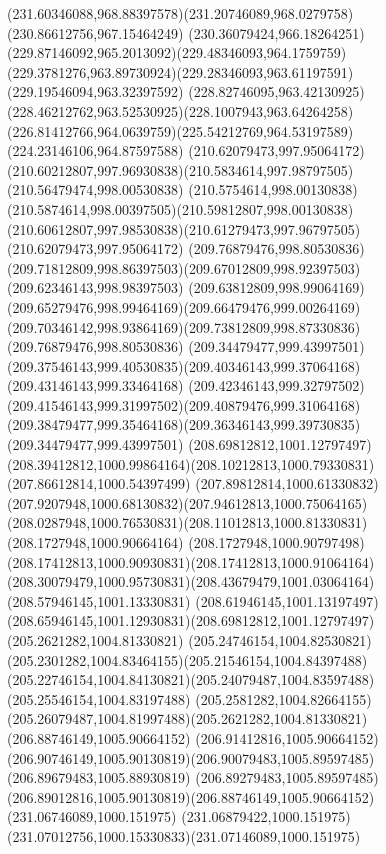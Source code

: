 {{\curveto(231.60346088,968.88397578)(231.20746089,968.0279758)(230.86612756,967.15464249)
\curveto(230.36079424,966.18264251)(229.87146092,965.2013092)(229.48346093,964.1759759)
\curveto(229.3781276,963.89730924)(229.28346093,963.61197591)(229.19546094,963.32397592)
\curveto(228.82746095,963.42130925)(228.46212762,963.52530925)(228.1007943,963.64264258)
\curveto(226.81412766,964.0639759)(225.54212769,964.53197589)(224.23146106,964.87597588)
\moveto(210.62079473,997.95064172)
\curveto(210.60212807,997.96930838)(210.5834614,997.98797505)(210.56479474,998.00530838)
\curveto(210.5754614,998.00130838)(210.5874614,998.00397505)(210.59812807,998.00130838)
\curveto(210.60612807,997.98530838)(210.61279473,997.96797505)(210.62079473,997.95064172)
\moveto(209.76879476,998.80530836)
\curveto(209.71812809,998.86397503)(209.67012809,998.92397503)(209.62346143,998.98397503)
\curveto(209.63812809,998.99064169)(209.65279476,998.99464169)(209.66479476,999.00264169)
\curveto(209.70346142,998.93864169)(209.73812809,998.87330836)(209.76879476,998.80530836)
\moveto(209.34479477,999.43997501)
\curveto(209.37546143,999.40530835)(209.40346143,999.37064168)(209.43146143,999.33464168)
\curveto(209.42346143,999.32797502)(209.41546143,999.31997502)(209.40879476,999.31064168)
\curveto(209.38479477,999.35464168)(209.36346143,999.39730835)(209.34479477,999.43997501)
\moveto(208.69812812,1001.12797497)
\curveto(208.39412812,1000.99864164)(208.10212813,1000.79330831)(207.86612814,1000.54397499)
\curveto(207.89812814,1000.61330832)(207.9207948,1000.68130832)(207.94612813,1000.75064165)
\curveto(208.0287948,1000.76530831)(208.11012813,1000.81330831)(208.1727948,1000.90664164)
\curveto(208.1727948,1000.90797498)(208.17412813,1000.90930831)(208.17412813,1000.91064164)
\curveto(208.30079479,1000.95730831)(208.43679479,1001.03064164)(208.57946145,1001.13330831)
\curveto(208.61946145,1001.13197497)(208.65946145,1001.12930831)(208.69812812,1001.12797497)
\moveto(205.2621282,1004.81330821)
\curveto(205.24746154,1004.82530821)(205.2301282,1004.83464155)(205.21546154,1004.84397488)
\curveto(205.22746154,1004.84130821)(205.24079487,1004.83597488)(205.25546154,1004.83197488)
\curveto(205.2581282,1004.82664155)(205.26079487,1004.81997488)(205.2621282,1004.81330821)
\moveto(206.88746149,1005.90664152)
\lineto(206.91412816,1005.90664152)
\curveto(206.90746149,1005.90130819)(206.90079483,1005.89597485)(206.89679483,1005.88930819)
\curveto(206.89279483,1005.89597485)(206.89012816,1005.90130819)(206.88746149,1005.90664152)
\moveto(231.06746089,1000.151975)
\curveto(231.06879422,1000.151975)(231.07012756,1000.15330833)(231.07146089,1000.151975)
}}
